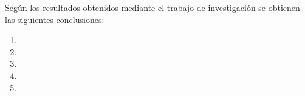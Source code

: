 \begin{conclusiones}
	
Según los resultados obtenidos mediante el trabajo de investigación se obtienen las siguientes conclusiones:

\begin{enumerate}
\item \lipsum[1][1-4]
\item \lipsum[1][1-4]
\item \lipsum[1][1-4]
\item \lipsum[1][1-4]
\item \lipsum[1][1-4]
\end{enumerate}
	
\end{conclusiones}
